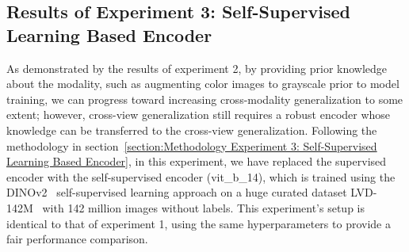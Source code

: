 \subsection{Results of Experiment 3: Self-Supervised Learning Based Encoder}
As demonstrated by the results of experiment 2, by providing prior knowledge about the modality, such as augmenting color images to grayscale prior to model training, we can progress toward increasing cross-modality generalization to some extent; however, cross-view generalization still requires a robust encoder whose knowledge can be transferred to the cross-view generalization. Following the methodology in section~\ref{section:Methodology Experiment 3: Self-Supervised Learning Based Encoder}, in this experiment, we have replaced the supervised encoder with the self-supervised encoder (vit\_b\_14), which is trained using the DINOv2~\citep{dinov2_oquab2023dinov2} self-supervised learning approach on a huge curated dataset LVD-142M~\citep{dinov2_oquab2023dinov2} with 142 million images without labels. This experiment's setup is identical to that of experiment 1, using the same hyperparameters to provide a fair performance comparison.


